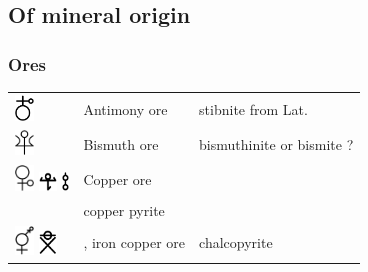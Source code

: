 \documentclass[british,final,landscape]{scrartcl}
\begin{document}
\begin{refsection}
\subsection{Of mineral origin}		

\subsubsection{Ores}


 \tablelasttail{\bottomrule}\label{tab:ores}
 \begin{supertabular}{p{0.3\textwidth}p{0.34\textwidth}p{0.34\textwidth}}
   \includegraphics[width=5mm]{Mineral/AntimonyOre} & Antimony ore & stibnite  from Lat.  \\
   \includegraphics[width=5mm]{Mineral/BismuthOre} & Bismuth ore & bismuthinite  or bismite ?\\
   \includegraphics[width=5mm]{Mineral/CopperOre} \includegraphics[width=5mm]{Mineral/CopperOre2} \includegraphics[height=5mm]{Mineral/CopperOre3} &  Copper ore &  \\
   & copper pyrite & \\
   \includegraphics[width=5mm]{Mineral/IronCopperOre} \includegraphics[width=5mm]{Mineral/IronCopperOre2} & , iron copper ore & chalcopyrite  \\

\end{supertabular}
\end{refsection}
\end{document}
